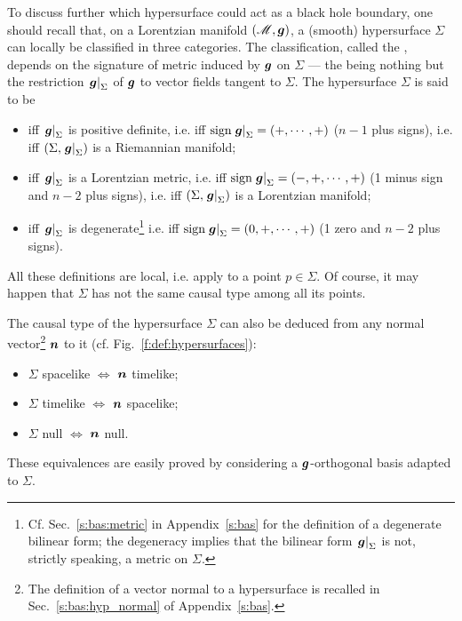 To discuss further which hypersurface could act as a black hole boundary,
one should recall that, on a Lorentzian manifold $(\mathscr{M},\bm{g})$,
a (smooth) hypersurface $\Sigma$ can locally be classified in three categories.
The classification, called the ,
depends on the signature of metric induced by $\bm{g}$ on
$\Sigma$  --- the
 being
nothing but the restriction $\left.\bm{g}\right| _{\Sigma}$ of $\bm{g}$
to vector fields tangent to $\Sigma$.
The hypersurface $\Sigma$ is said to be
\begin{itemize}
\item {} iff $\left.\bm{g}\right| _{\Sigma}$ is positive definite,
i.e. iff $\mathrm{sign} \left.\bm{g}\right| _{\Sigma} = (+,\cdots,+)$ ($n-1$ plus signs),
i.e. iff $(\Sigma,  \left.\bm{g}\right| _{\Sigma})$ is a Riemannian manifold;
\item {} iff $\left.\bm{g}\right| _{\Sigma}$ is a Lorentzian metric,
i.e. iff $\mathrm{sign} \left.\bm{g}\right| _{\Sigma} = (-,+,\cdots,+)$ (1 minus sign and
$n-2$ plus signs),
i.e. iff $(\Sigma,  \left.\bm{g}\right| _{\Sigma})$ is a Lorentzian manifold;
\item {} iff $\left.\bm{g}\right| _{\Sigma}$ is degenerate\footnote{
Cf. Sec.~\ref{s:bas:metric} in Appendix~\ref{s:bas} for the definition of a
degenerate bilinear form; the degeneracy
implies that the bilinear form $\left.\bm{g}\right| _{\Sigma}$ is not,
strictly speaking, a metric on $\Sigma$.}
i.e. iff $\mathrm{sign} \left.\bm{g}\right| _{\Sigma} = (0,+,\cdots,+)$
(1 zero and $n-2$ plus signs).
\end{itemize}
All these definitions are local, i.e. apply to a point $p\in\Sigma$.
Of course, it may happen that $\Sigma$ has not the same causal type
among all its points.

The causal type of the hypersurface $\Sigma$
can also be deduced from any normal vector\footnote{
The definition of a vector normal to a hypersurface is recalled in Sec.~\ref{s:bas:hyp_normal} of Appendix~\ref{s:bas}.}
$\bm{n}$ to it (cf. Fig.~\ref{f:def:hypersurfaces}):
\begin{itemize}
\item $\Sigma$ spacelike $\iff$ $\bm{n}$ timelike;
\item $\Sigma$ timelike $\iff$ $\bm{n}$ spacelike;
\item $\Sigma$ null $\iff$ $\bm{n}$ null.
\end{itemize}
These equivalences are easily proved by considering a $\bm{g}$-orthogonal basis
adapted to $\Sigma$.

